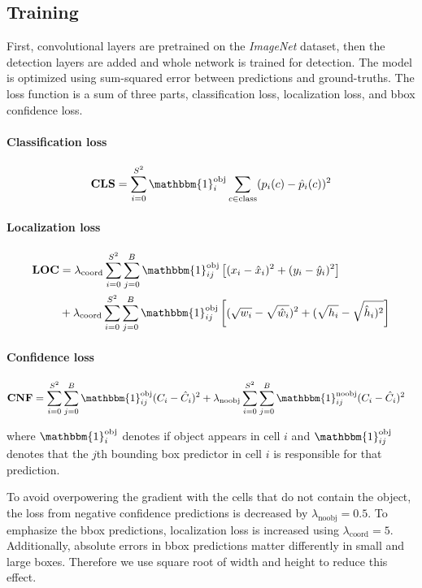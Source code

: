 \subsection{Training}
First, convolutional layers are pretrained on the \textit{ImageNet} dataset, then the detection layers are added and whole network is trained for detection. The model is optimized using sum-squared error between predictions and ground-truths. The loss function is a sum of three parts, classification loss, localization loss, and bbox confidence loss. 

\paragraph{Classification loss}
\begin{align*}
\mathbf{CLS} = \sum_{i=0}^{S^2}\mathbbm{1}_i^{\text{obj}} \sum_{c\in \text{class}} (p_i(c) - \hat{p}_i(c))^2
\end{align*}

\paragraph{Localization loss}
\begin{align*}
\mathbf{LOC} &= \lambda_{\text{coord}} \sum_{i=0}^{S^2} \sum_{j=0}^B \mathbbm{1}_{ij}^{\text{obj}} \left[(x_i - \hat{x}_i)^2 + (y_i - \hat{y}_i)^2\right] \\
 &+  \lambda_{\text{coord}} \sum_{i=0}^{S^2} \sum_{j=0}^B \mathbbm{1}_{ij}^{\text{obj}} \left[(\sqrt{w_i} - \sqrt{\hat{w}_i})^2 + (\sqrt{h_i} - \sqrt{\hat{h}_i)^2}\right]
\end{align*}

\paragraph{Confidence loss}
\begin{align*}
\mathbf{CNF} &= \sum_{i=0}^{S^2} \sum_{j=0}^B \mathbbm{1}_{ij}^{\text{obj}} (C_i - \hat{C}_i)^2 
+ \lambda_{\text{noobj}} \sum_{i=0}^{S^2} \sum_{j=0}^B \mathbbm{1}_{ij}^{\text{noobj}} (C_i - \hat{C}_i)^2
\end{align*}

\noindent where $\mathbbm{1}^{\text{obj}}_i$ denotes if object appears in cell $i$ and $\mathbbm{1}^{\text{obj}}_{ij}$ denotes that the $j$th bounding box predictor in cell $i$ is responsible for that prediction.

To avoid overpowering the gradient with the cells that do not contain the object, the loss from negative confidence predictions is decreased by $\lambda_{\text{noobj}} = 0.5$. To emphasize the bbox predictions, localization loss is increased using $\lambda_{\text{coord}} = 5$. Additionally, absolute errors in bbox predictions matter differently in small and large boxes. Therefore we use square root of width and height to reduce this effect. 



